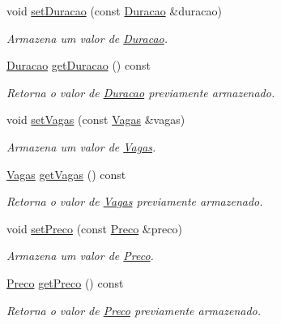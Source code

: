 \begin{DoxyCompactItemize}
void \hyperlink{classshibarides_1_1Carona_a3d6564b9ba1e3670d0c8ce87a011b0c3}{set\+Duracao} (const \hyperlink{classshibarides_1_1Duracao}{Duracao} \&duracao)
\begin{DoxyCompactList}\small\item\em Armazena um valor de \hyperlink{classshibarides_1_1Duracao}{Duracao}. \end{DoxyCompactList}\item 
\hyperlink{classshibarides_1_1Duracao}{Duracao} \hyperlink{classshibarides_1_1Carona_a992c3626a20b5195aca7fb92987c3992}{get\+Duracao} () const 
\begin{DoxyCompactList}\small\item\em Retorna o valor de \hyperlink{classshibarides_1_1Duracao}{Duracao} previamente armazenado. \end{DoxyCompactList}\item 
void \hyperlink{classshibarides_1_1Carona_a88df340d8ee646d86e2b5ed20c56dacc}{set\+Vagas} (const \hyperlink{classshibarides_1_1Vagas}{Vagas} \&vagas)
\begin{DoxyCompactList}\small\item\em Armazena um valor de \hyperlink{classshibarides_1_1Vagas}{Vagas}. \end{DoxyCompactList}\item 
\hyperlink{classshibarides_1_1Vagas}{Vagas} \hyperlink{classshibarides_1_1Carona_abcc251acf0ef08c20b845832d5cba6db}{get\+Vagas} () const 
\begin{DoxyCompactList}\small\item\em Retorna o valor de \hyperlink{classshibarides_1_1Vagas}{Vagas} previamente armazenado. \end{DoxyCompactList}\item 
void \hyperlink{classshibarides_1_1Carona_a6db9b66a554694539c5f5aa4f13657a1}{set\+Preco} (const \hyperlink{classshibarides_1_1Preco}{Preco} \&preco)
\begin{DoxyCompactList}\small\item\em Armazena um valor de \hyperlink{classshibarides_1_1Preco}{Preco}. \end{DoxyCompactList}\item 
\hyperlink{classshibarides_1_1Preco}{Preco} \hyperlink{classshibarides_1_1Carona_a8ec9d24a04fe95497976b985ec7c6c04}{get\+Preco} () const 
\begin{DoxyCompactList}\small\item\em Retorna o valor de \hyperlink{classshibarides_1_1Preco}{Preco} previamente armazenado. \end{DoxyCompactList}\end{DoxyCompactItemize}
